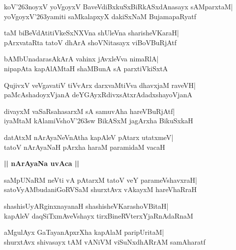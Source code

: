 \documentclass[twoside,12pt,openright]{book}
\def\S{\char'263}
\newcounter{shloka}[chapter]
\def\uvaca#1{\centerline{{\large\textbf{#1}}}}
\begin{document}
\begin{shloka}%
koV\S noyxV yoVgoyxV BaveVdiBxkuSxBiRkASxdAnasayx sAMparxtaM|\\
yoVgoyxV\S yamiti saMkalapxyX dakiSxNaM BujamapaRyatf
\end{shloka}

\begin{shloka}%
taM biBeVdAtitiVkeSxNXVna shUleVna sharisheVKaraH|\\
pArxvataRta tatoV dhArA shoVNitasayx viBoVBuRjAtf
\end{shloka}

\begin{shloka}%
bAMbUnadarasAkArA vahinx jAvxleVva nimaRlA|\\
nipapAta kapAlAMtaH shaMBunA sA parxtiVkiSxtA
\end{shloka}

\begin{shloka}%
QujivxV veVgavatiV tiVvArx darxvaMtiVva dhavxjaM raveVH|\\
paMcAshadoyxVjanA deYGAyxRdivxsAtxrAdadxshayoVjanA
\end{shloka}

\begin{shloka}%
divayxM vaSaRsahasarxM sA samuvAha hareVBuRjAtf|\\
iyaMtaM kAlamiVshoV\S sw BikASxM jagArxha BikuSxkaH
\end{shloka}

\begin{shloka}%
datAtxM nArAyaNeVnAtha kapAleV pAtarx utatxmeV|\\
tatoV nArAyaNaH pArxha haraM paramidaM vacaH
\end{shloka}

\uvaca{|| nArAyaNa uvAca ||}
\begin{shloka}%
saMpUNaRM neVti vA pAtarxM tatoV veY parameVshavxraH|\\
satoVyAMbudaniGoRVSaM shurxtAvx vAkayxM hareVhaRraH
\end{shloka}

\begin{shloka}%
shashisUyARginxnayanaH shashisheVKarashoVBitaH|\\
kapAleV daqSiTxmAveVshayx tirxBineRVterxYjaRnAdaRnaM
\end{shloka}

\begin{shloka}%
aMgulAyx GaTayanApxrXha kapAlaM paripUritaM|\\
shurxtAvx shivasayx tAM vANiVM viSuNxdhARrAM samAharatf
\end{shloka}
\end{document}
